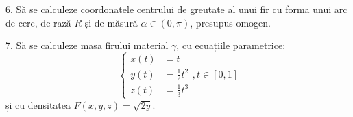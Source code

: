 \documentclass[11pt,a4paper]{article}
\theoremstyle{dotless}
\theoremstyle{dotlessdr}
\begin{document}
\vspace{1cm}

6. Să se calculeze coordonatele centrului de greutate al unui fir cu forma unui
arc de cerc, de rază $R$ și de măsură $\alpha \in (0, \pi)$, presupus omogen.

\vspace{1cm}

7. Să se calculeze masa firului material $\gamma$, cu ecuațiile parametrice:
\[
  \begin{cases}
    x(t) &= t \\
    y(t) &= \frac{1}{2} t^2 \\
    z(t) &= \frac{1}{3} t^3
  \end{cases}, t \in [0, 1]
\]
și cu densitatea $F(x, y, z) = \sqrt{2y}$.
\end{document}
